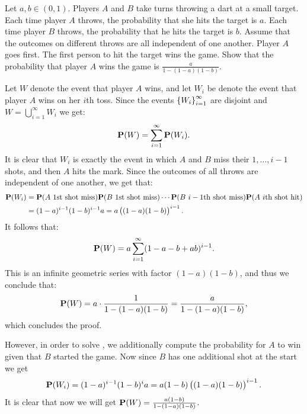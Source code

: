 \documentclass[11pt,a4paper]{article}
\begin{document}
\begin{exercise}
  \label{ex:one-six}
  Let $a,b \in (0,1)$.
  Players $A$ and $B$ take turns throwing a dart at a small target.
  Each time player $A$ throws, the probability that she hits the target is $a$.
  Each time player $B$ throws, the probability that he hits the target is $b$.
  Assume that the outcomes on different throws are all independent of one another.
  Player $A$ goes first.
  The first person to hit the target wins the game.
  Show that the probability that player $A$ wins the game
  is $\frac{a}{1 - (1 - a) (1 - b)}$.
\end{exercise}
\begin{solution}
  Let $W$ denote the event that player $A$ wins,
  and let $W_i$ be denote the event that player $A$ wins on her $i$th toss.
  Since the events $\left\{W_i\right\}_{i=1}^{\infty}$ are disjoint
  and $W = \bigcup_{i=1}^{\infty} W_i$ we get:
  \[
    \mathbf{P}(W) =
    \sum_{i=1}^{\infty} \mathbf{P}(W_i).
  \]
  It is clear that $W_i$ is exactly the event in which
  $A$ and $B$ miss their $1,\dots,i-1$ shots,
  and then $A$ hits the mark.
  Since the outcomes of all throws are independent of one another,
  we get that:
  \begin{align*}
    \Prob(W_i) &=
    \Prob(\text{$A$ $1$st shot miss})
    \Prob(\text{$B$ $1$st shot miss}) \cdots
    \Prob(\text{$B$ $i-1$th shot miss})
    \Prob(\text{$A$ $i$th shot hit}) \\ &=
    (1 - a)^{i-1} (1 - b)^{i-1} a =
    a \del{(1 - a)(1 - b)}^{i-1}.
  \end{align*}
  It follows that:
  \[
    \mathbf{P}(W) =
    a \sum_{i=1}^{\infty} (1 - a - b + ab)^{i-1}.
  \]
  This is an infinite geometric series with factor $(1 - a)(1 - b)$,
  and thus we conclude that:
  \[
    \mathbf{P}(W) =
    a \cdot \frac{1}{1 - (1 - a) (1 - b)} =
    \frac{a}{1 - (1 - a) (1 - b)},
  \]
  which concludes the proof.
  
  However, in order to solve ,
  we additionally compute the probability for $A$ to win given that
  $B$ started the game.
  Now since $B$ has one additional shot at the start we get
  \[
    \Prob(W_i) =
    (1 - a)^{i-1} (1 - b)^{i} a =
    a (1 - b) \del{(1 - a)(1 - b)}^{i-1}.
  \]
  It is clear that now we will get
  $\mathbf{P}(W) = \frac{a (1 - b)}{1 - (1 - a) (1 - b)}$.
\end{solution}
\end{document}
